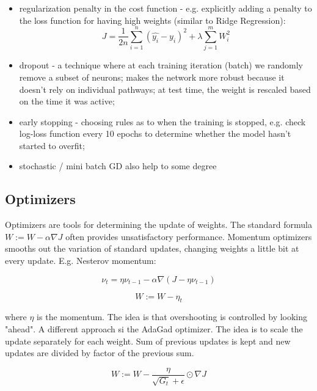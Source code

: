 \documentclass[11pt]{book}
\begin{document}
\begin{itemize}
\item regularization penalty in the cost function - e.g. explicitly adding a penalty to the loss function for having high weights (similar to Ridge Regression):
\begin{equation}
J = \frac{1}{2n} \sum_{i=1}^{n} (\hat{y_i} - y_i)^2 + \lambda \sum_{j=1}^{m} W_i^2
\end{equation}

\item dropout - a technique where at each training iteration (batch) we randomly remove a subset of neurons; makes the network more robust because it doesn't rely on individual pathways; at test time, the weight is rescaled based on the time it was active;
\item early stopping - choosing rules as to when the training is stopped, e.g. check log-loss function every 10 epochs to determine whether the model hasn't started to overfit;
\item stochastic / mini batch GD also help to some degree

\end{itemize}



\subsection{Optimizers}

Optimizers are tools for determining the update of weights. The standard formula $W :=  W - \alpha \nabla  J$ often provides unsatisfactory performance. Momentum optimizers smooths out the variation of standard updates, changing weights a little bit at every update. E.g. Nesterov momentum:

\begin{equation}
\nu_t = \eta \nu_{t-1} - \alpha \nabla (J - \eta \nu_{t-1})
\end{equation}

\begin{equation}
W := W - \eta_t
\end{equation}

where $\eta$ is the momentum. The idea is that overshooting is controlled by looking "ahead". A different approach si the AdaGad optimizer. The idea is to scale the update separately for each weight. Sum of previous updates is kept and new updates are divided by factor of the previous sum.

\begin{equation}
W := W - \frac{\eta}{\sqrt{G_t} + \epsilon} \odot \nabla J
\end{equation}
\end{document}
